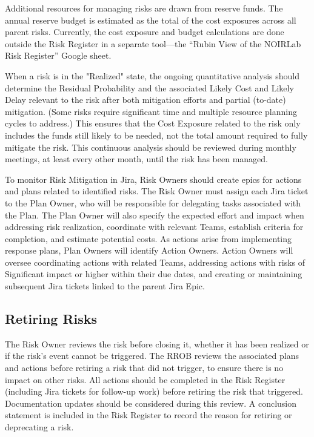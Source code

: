 Additional resources for managing risks are drawn from reserve funds. The annual reserve budget is estimated as the total of the cost exposures across all parent risks. Currently, the cost exposure and budget calculations are done outside the Risk Register in a separate tool—the ``Rubin View of the NOIRLab Risk Register'' Google sheet.

When a risk is in the "Realized" state, the ongoing quantitative analysis should determine the Residual Probability and the associated Likely Cost and Likely Delay relevant to the risk after both mitigation efforts and partial (to-date) mitigation. (Some risks require significant time and multiple resource planning cycles to address.) This ensures that the Cost Exposure related to the risk only includes the funds still likely to be needed, not the total amount required to fully mitigate the risk. This continuous analysis should be reviewed during monthly meetings, at least every other month, until the risk has been managed.

To monitor Risk Mitigation in Jira, Risk Owners should create epics for actions and plans related to identified risks. The Risk Owner must assign each Jira ticket to the Plan Owner, who will be responsible for delegating tasks associated with the Plan. The Plan Owner will also specify the expected effort and impact when addressing risk realization, coordinate with relevant Teams, establish criteria for completion, and estimate potential costs. As actions arise from implementing response plans, Plan Owners will identify Action Owners. Action Owners will oversee coordinating actions with related Teams, addressing actions with risks of Significant impact or higher within their due dates, and creating or maintaining subsequent Jira tickets linked to the parent Jira Epic. 

\subsection{Retiring Risks}

The Risk Owner reviews the risk before closing it, whether it has been realized or if the risk's event cannot be triggered. The RROB reviews the associated plans and actions before retiring a risk that did not trigger, to ensure there is no impact on other risks. All actions should be completed in the Risk Register (including Jira tickets for follow-up work) before retiring the risk that triggered. Documentation updates should be considered during this review. A conclusion statement is included in the Risk Register to record the reason for retiring or deprecating a risk.

